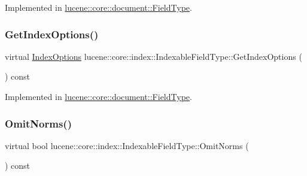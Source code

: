 Implemented in \mbox{\hyperlink{classlucene_1_1core_1_1document_1_1FieldType_ac5b53a2d9ebbb926199f9e2f58dc0537}{lucene\+::core\+::document\+::\+Field\+Type}}.

\mbox{\label{classlucene_1_1core_1_1index_1_1IndexableFieldType_afe678be1fafcb17c6142fc662ee793e4}} 
\subsubsection{\texorpdfstring{Get\+Index\+Options()}{GetIndexOptions()}}
{\footnotesize\ttfamily virtual \mbox{\hyperlink{namespacelucene_1_1core_1_1index_a0d5e1f98471a76de106056cf3b5a7897}{Index\+Options}} lucene\+::core\+::index\+::\+Indexable\+Field\+Type\+::\+Get\+Index\+Options (\begin{DoxyParamCaption}{ }\end{DoxyParamCaption}) const\hspace{0.3cm}{\ttfamily [pure virtual]}}



Implemented in \mbox{\hyperlink{classlucene_1_1core_1_1document_1_1FieldType_ae51c6c54d9992fbe3102715ff94778ec}{lucene\+::core\+::document\+::\+Field\+Type}}.

\mbox{\label{classlucene_1_1core_1_1index_1_1IndexableFieldType_afc45bc2031d22fc941ea89b1ba881526}} 
\subsubsection{\texorpdfstring{Omit\+Norms()}{OmitNorms()}}
{\footnotesize\ttfamily virtual bool lucene\+::core\+::index\+::\+Indexable\+Field\+Type\+::\+Omit\+Norms (\begin{DoxyParamCaption}{ }\end{DoxyParamCaption}) const\hspace{0.3cm}{\ttfamily [pure virtual]}}



